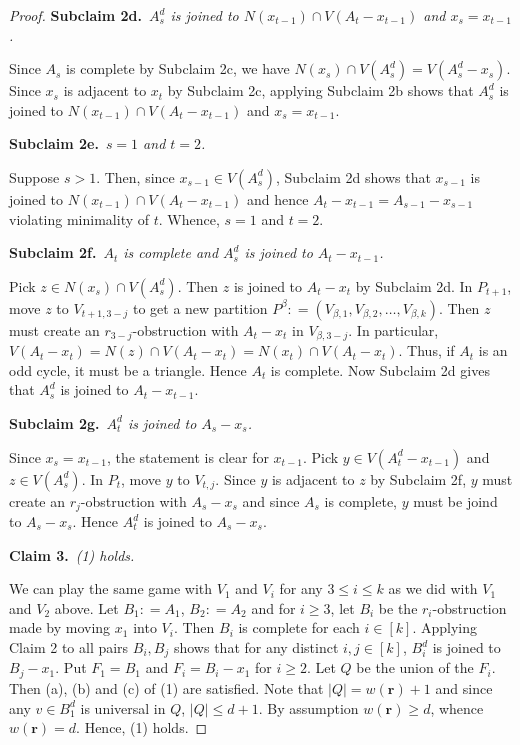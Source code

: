 \documentclass[12pt]{amsart}
\theoremstyle{plain}
\theoremstyle{definition}
\theoremstyle{remark}
\newcommand{\card}[1]{\left|#1\right|}
\newcommand{\irange}[1]{\left[#1\right]}
\newcommand{\parens}[1]{\left( #1 \right)}
\newcommand{\DefinedAs}{\mathrel{\mathop:}=}
\newcommand{\mov}[2]{#1^{#2}}
\newcommand{\wt}[1]{w\parens{#1}}
\renewcommand{\vec}[1]{\mathbf{#1}}
\newcommand{\claim}[2]{{\bf Claim #1.}~{\it #2}~~}
\newcommand{\subclaim}[2]{{\bf Subclaim #1.}~{\it #2}~~}
\begin{document}
\begin{proof}
			\subclaim{2d}{$\mov{A_s}{d}$ is joined to $N(x_{t-1}) \cap V(A_t - x_{t-1})$ and $x_s = x_{t-1}$.}

			Since $A_s$ is complete by Subclaim 2c, we have $N(x_s) \cap V(\mov{A_s}{d}) = V(\mov{A_s}{d} - x_s)$.  Since $x_s$ is adjacent to $x_t$ by Subclaim 2c, applying Subclaim 2b shows that $\mov{A_s}{d}$ is joined to $N(x_{t-1}) \cap V(A_t - x_{t-1})$ and $x_s = x_{t-1}$.  
			
			\subclaim{2e}{$s=1$ and $t=2$.} 

			Suppose $s > 1$.  Then, since $x_{s-1} \in V(\mov{A_s}{d})$, Subclaim 2d shows that $x_{s-1}$ is joined to $N(x_{t-1}) \cap V(A_t - x_{t-1})$ and hence $A_t - x_{t-1} = A_{s - 1} - x_{s-1}$ violating
			minimality of $t$.  Whence, $s = 1$ and $t=2$.
				
			\subclaim{2f}{$A_t$ is complete and $\mov{A_s}{d}$ is joined to $A_t - x_{t-1}$.}

			Pick $z \in N(x_s) \cap V(\mov{A_s}{d})$.  Then $z$ is joined to $A_t-x_t$ by Subclaim 2d.
			In $P_{t+1}$, move $z$ to $V_{t+1, 3-j}$ to
			get a new partition $P^{\beta} \DefinedAs \parens{V_{\beta, 1},
			V_{\beta, 2}, \ldots, V_{\beta, k}}$. Then $z$ must create an
			$r_{3-j}$-obstruction with $A_t - x_t$ in $V_{\beta, 3-j}$.  In
			particular, $V(A_t - x_t) = N(z) \cap V(A_t - x_t) = N(x_t) \cap V(A_t - x_t)$. Thus, if $A_t$ is an odd cycle, it must be a triangle.  	Hence $A_t$ is complete. Now Subclaim 2d gives that $\mov{A_s}{d}$ is joined to $A_t - x_{t-1}$.

			\subclaim{2g}{$\mov{A_t}{d}$ is joined to $A_s - x_s$.}
			
			Since $x_s = x_{t-1}$, the statement is clear for $x_{t-1}$. Pick $y \in V(\mov{A_t}{d} - x_{t-1})$ and $z \in V(\mov{A_s}{d})$. In $P_t$, move $y$ to $V_{t, j}$.  Since $y$ is adjacent to $z$ by Subclaim 2f, $y$ must create an $r_j$-obstruction with $A_s - x_s$ and since $A_s$ is complete, $y$ must be joind to $A_s - x_s$.  Hence $\mov{A_t}{d}$ is joined to $A_s - x_s$.
						
         \claim{3}{(1) holds.}
         
			We can play the same game with $V_1$ and $V_i$ for any
			$3 \leq i \leq k$ as we did with $V_1$ and $V_2$ above.  Let $B_1 \DefinedAs A_1$, $B_2 \DefinedAs A_2$ and for $i \geq 3$, let $B_i$ be the $r_i$-obstruction made by moving
			$x_1$ into $V_i$.  Then $B_i$ is complete for each $i \in \irange{k}$. 
			Applying Claim 2 to all pairs $B_i, B_j$ shows that for any
			distinct $i, j \in \irange{k}$, $\mov{B_i}{d}$ is joined to $B_j - x_1$. 
			Put $F_1 = B_1$ and $F_i = B_i - x_1$ for $i \geq 2$.  
			Let $Q$ be the union of the $F_i$.  Then (a), (b) and (c) of (1) are satisfied.
			Note that $\card{Q} = \wt{\vec{r}}+1$ and since any $v \in B_1^d$ is universal in $Q$,
			$\card{Q} \leq d + 1$. By assumption $\wt{\vec{r}} \geq d$, whence $\wt{\vec{r}}=d$.  
			Hence, (1) holds.
\end{proof}
	
\end{document}
